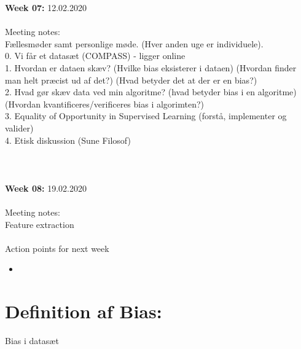 \documentclass[11pt, fleqn]{article}
\begin{document}
	\textbf{Week 07:}  12.02.2020 \\\\
	\noindent
	Meeting notes: \\ Fællesmøder samt personlige møde. (Hver anden uge er individuele). \\0. Vi får et datasæt (COMPASS) - ligger online \\
	1. Hvordan er dataen skæv? (Hvilke bias eksisterer i dataen) (Hvordan finder man helt præcist ud af det?) (Hvad betyder det at der er en bias?) \\
	2. Hvad gør skæv data ved min algoritme? (hvad betyder bias i en algoritme) (Hvordan kvantificeres/verificeres bias i algorimten?) \\
	3. Equality of Opportunity in Supervised Learning (forstå, implementer og valider) \\ 
	4. Etisk diskussion (Sune Filosof)
	\\\\\\\\
	\textbf{Week 08:}  19.02.2020 \\\\
	\noindent
	Meeting notes: \\ Feature extraction
	\\\\
	Action points for next week
	\begin{itemize}
		\item  
	\end{itemize}


\section*{Definition af Bias:}
	
	Bias i datasæt 
		
	
\end{document}
